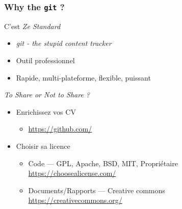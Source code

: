 \documentclass[table,tikz,12pt,svgnames]{beamer}
\begin{document}
\begin{frame}
\frametitle{Why the \texttt{git} ?}
\begin{block}{C'est \textit{Ze Standard}}
	\begin{itemize}
		\item \textit{git - the stupid content tracker}
		\item Outil professionnel
		\item Rapide, multi-plateforme, flexible, puissant
	\end{itemize}
\end{block}
\begin{block}{\textit{To Share or Not to Share ?}}
	\begin{itemize}
		\item Enrichissez vos CV
		\begin{itemize}
			\item \url{https://github.com/}
		\end{itemize}
		\item Choisir sa licence
		\begin{itemize}
			\item Code --- GPL, Apache, BSD, MIT, Propriétaire \url{https://choosealicense.com/}
			\item Documents/Rapports --- Creative commons \url{https://creativecommons.org/}
		\end{itemize}
	\end{itemize}
\end{block}
\end{frame}

\end{document}

